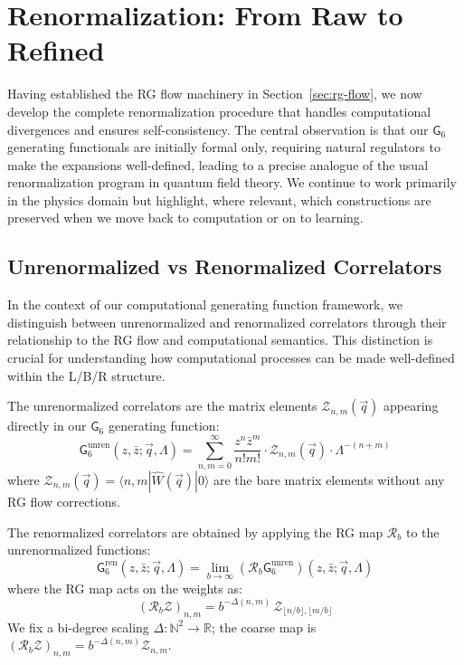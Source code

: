 \section{Renormalization: From Raw to Refined}
\label{sec:renormalization}

Having established the RG flow machinery in Section~\ref{sec:rg-flow}, we now develop the complete renormalization procedure that handles computational divergences and ensures self-consistency. The central observation is that our $\mathsf{G}_6$ generating functionals are initially formal only, requiring natural regulators to make the expansions well-defined, leading to a precise analogue of the usual renormalization program in quantum field theory. We continue to work primarily in the physics domain but highlight, where relevant, which constructions are preserved when we move back to computation or on to learning.

\subsection{Unrenormalized vs Renormalized Correlators}

In the context of our computational generating function framework, we distinguish between unrenormalized and renormalized correlators through their relationship to the RG flow and computational semantics. This distinction is crucial for understanding how computational processes can be made well-defined within the L/B/R structure.

\begin{definition}
\label{def:unrenormalized-greens}
The unrenormalized correlators are the matrix elements $\mathcal{Z}_{n,m}(\vec{q})$ appearing directly in our $\mathsf{G}_6$ generating function:
\[
\mathsf{G}_6^{\text{unren}}(z, \bar{z}; \vec{q}, \Lambda) = \sum_{n,m=0}^{\infty} \frac{z^n \bar{z}^m}{n! m!} \cdot \mathcal{Z}_{n,m}(\vec{q}) \cdot \Lambda^{-(n+m)}
\]
where $\mathcal{Z}_{n,m}(\vec{q}) = \langle n,m|\hat{W}(\vec{q})|0\rangle$ are the bare matrix elements without any RG flow corrections.
\end{definition}

\begin{definition}
\label{def:renormalized-greens}
The renormalized correlators are obtained by applying the RG map $\mathcal{R}_b$ to the unrenormalized functions:
\[
\mathsf{G}_6^{\text{ren}}(z, \bar{z}; \vec{q}, \Lambda) = \lim_{b \to \infty} (\mathcal{R}_b \mathsf{G}_6^{\text{unren}})(z, \bar{z}; \vec{q}, \Lambda)
\]
where the RG map acts on the weights as:
\[
(\mathcal{R}_b\mathcal{Z})_{n,m} = b^{-\Delta(n,m)}\,\mathcal{Z}_{\lfloor n/b\rfloor,\lfloor m/b\rfloor}
\]
We fix a bi-degree scaling $\Delta:\mathbb{N}^2\to\mathbb{R}$; the coarse map is $(\mathcal{R}_b\mathcal{Z})_{n,m}=b^{-\Delta(n,m)}\mathcal{Z}_{n,m}$.
\end{definition}

